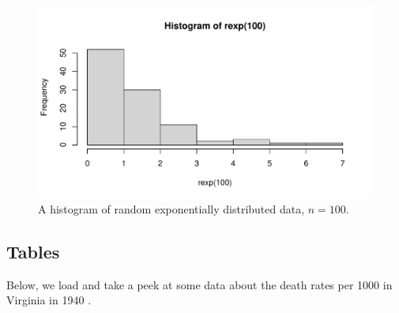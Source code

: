 \documentclass{article}\usepackage[]{graphicx}\usepackage[]{xcolor}
\makeatletter
\def\maxwidth{ %
  \ifdim\Gin@nat@width>\linewidth
    \linewidth
  \else
    \Gin@nat@width
  \fi
}
\newenvironment{knitrout}{}{} %
\makeatother
\begin{document}
\begin{multicols}{2}
\begin{figure}[H]
\begin{center}
\begin{knitrout}
\color{fgcolor}
\includegraphics[width=\maxwidth]{figure/unnamed-chunk-6-1} 
\end{knitrout}

\caption{A histogram of random exponentially distributed data, $n=100.$}
\label{plot1}
\end{center}
\end{figure}



\subsection{Tables}
Below, we load and take a peek at some data about the death
rates per 1000 in Virginia in 1940 \citep{Molyneaux1947}.


\end{multicols}
\end{document}
